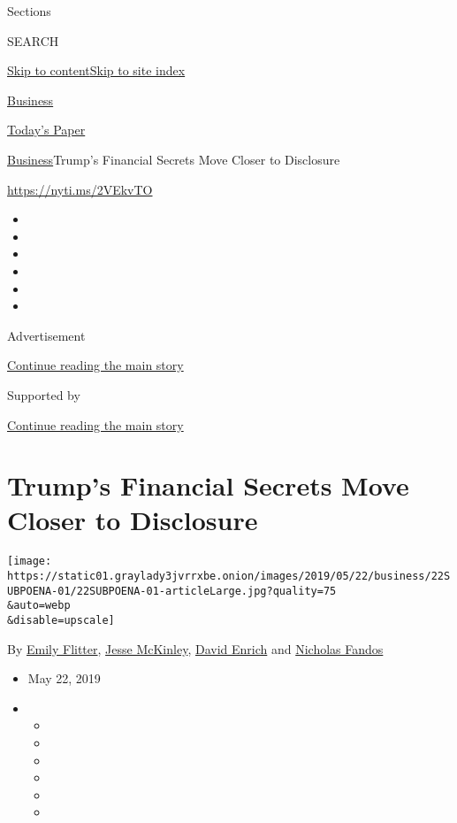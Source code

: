 Sections

SEARCH

\protect\hyperlink{site-content}{Skip to
content}\protect\hyperlink{site-index}{Skip to site index}

\href{https://www.nytimes3xbfgragh.onion/section/business}{Business}

\href{https://myaccount.nytimes3xbfgragh.onion/auth/login?response_type=cookie\&client_id=vi}{}

\href{https://www.nytimes3xbfgragh.onion/section/todayspaper}{Today's
Paper}

\href{/section/business}{Business}\textbar{}Trump's Financial Secrets
Move Closer to Disclosure

\url{https://nyti.ms/2VEkvTO}

\begin{itemize}
\item
\item
\item
\item
\item
\item
\end{itemize}

Advertisement

\protect\hyperlink{after-top}{Continue reading the main story}

Supported by

\protect\hyperlink{after-sponsor}{Continue reading the main story}

\hypertarget{trumps-financial-secrets-move-closer-to-disclosure}{%
\section{Trump's Financial Secrets Move Closer to
Disclosure}\label{trumps-financial-secrets-move-closer-to-disclosure}}

\texttt{[image: https://static01.graylady3jvrrxbe.onion/images/2019/05/22/business/22SUBPOENA-01/22SUBPOENA-01-articleLarge.jpg?quality=75\\\&auto=webp\\\&disable=upscale]}

By \href{https://www.nytimes3xbfgragh.onion/by/emily-flitter}{Emily
Flitter},
\href{https://www.nytimes3xbfgragh.onion/by/jesse-mckinley}{Jesse
McKinley},
\href{https://www.nytimes3xbfgragh.onion/by/david-enrich}{David Enrich}
and
\href{https://www.nytimes3xbfgragh.onion/by/nicholas-fandos}{Nicholas
Fandos}

\begin{itemize}
\item
  May 22, 2019
\item
  \begin{itemize}
  \item
  \item
  \item
  \item
  \item
  \item
  \end{itemize}
\end{itemize}

